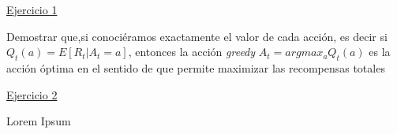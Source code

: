 \documentclass[12pt]{article}
\begin{document}
    \underline{Ejercicio 1}

    \noindent Demostrar que,si conociéramos exactamente el valor de cada acción, es decir si  $Q_{t} (a) = E \left[ R_{t} \big| A_{t}=a \right] $, entonces la acción \textit{greedy} $ A_{t} = argmax_{a}Q_{t}(a) $ es la acción óptima en el sentido de que permite maximizar las recompensas totales

	\underline{Ejercicio 2}

    \noindent Lorem Ipsum
\end{document}

